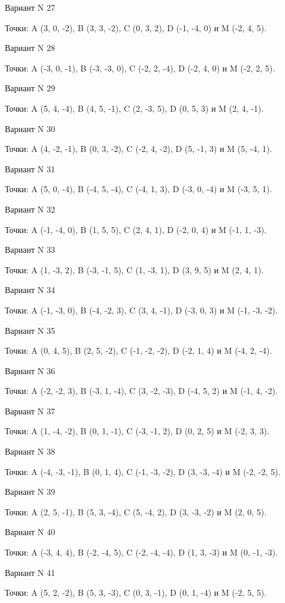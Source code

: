 \documentclass[11pt]{report}
\begin{document}
Вариант N 27

Точки: A (3, 0, -2), B (3, 3, -2), C (0, 3, 2), D (-1, -4, 0) и M (-2, 4, 5).

Вариант N 28

Точки: A (-3, 0, -1), B (-3, -3, 0), C (-2, 2, -4), D (-2, 4, 0) и M (-2, 2, 5).

Вариант N 29

Точки: A (5, 4, -4), B (4, 5, -1), C (2, -3, 5), D (0, 5, 3) и M (2, 4, -1).
\newpage


Вариант N 30

Точки: A (4, -2, -1), B (0, 3, -2), C (-2, 4, -2), D (5, -1, 3) и M (5, -4, 1).

Вариант N 31

Точки: A (5, 0, -4), B (-4, 5, -4), C (-4, 1, 3), D (-3, 0, -4) и M (-3, 5, 1).

Вариант N 32

Точки: A (-1, -4, 0), B (1, 5, 5), C (2, 4, 1), D (-2, 0, 4) и M (-1, 1, -3).

Вариант N 33

Точки: A (1, -3, 2), B (-3, -1, 5), C (1, -3, 1), D (3, 9, 5) и M (2, 4, 1).

Вариант N 34

Точки: A (-1, -3, 0), B (-4, -2, 3), C (3, 4, -1), D (-3, 0, 3) и M (-1, -3, -2).

Вариант N 35

Точки: A (0, 4, 5), B (2, 5, -2), C (-1, -2, -2), D (-2, 1, 4) и M (-4, 2, -4).

Вариант N 36

Точки: A (-2, -2, 3), B (-3, 1, -4), C (3, -2, -3), D (-4, 5, 2) и M (-1, 4, -2).

Вариант N 37

Точки: A (1, -4, -2), B (0, 1, -1), C (-3, -1, 2), D (0, 2, 5) и M (-2, 3, 3).

Вариант N 38

Точки: A (-4, -3, -1), B (0, 1, 4), C (-1, -3, -2), D (3, -3, -4) и M (-2, -2, 5).

Вариант N 39

Точки: A (2, 5, -1), B (5, 3, -4), C (5, -4, 2), D (3, -3, -2) и M (2, 0, 5).

Вариант N 40

Точки: A (-3, 4, 4), B (-2, -4, 5), C (-2, -4, -4), D (1, 3, -3) и M (0, -1, -3).

Вариант N 41

Точки: A (5, 2, -2), B (5, 3, -3), C (0, 3, -1), D (0, 1, -4) и M (-2, 5, 5).
\end{document}
